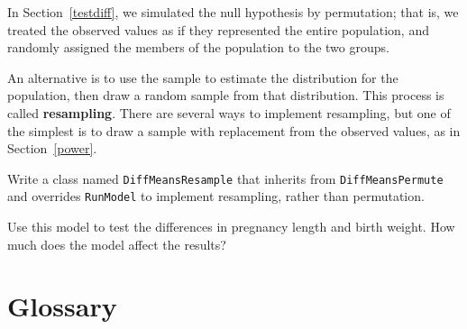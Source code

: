 \begin{exercise}

In Section~\ref{testdiff}, we simulated the null hypothesis by
permutation; that is, we treated the observed values as if they
represented the entire population, and randomly assigned the
members of the population to the two groups.

An alternative is to use the sample to estimate the distribution for
the population, then draw a random sample from that distribution.
This process is called {\bf resampling}.  There are several ways to
implement resampling, but one of the simplest is to draw a sample
with replacement from the observed values, as in Section~\ref{power}.

Write a class named {\tt DiffMeansResample} that inherits from
{\tt DiffMeansPermute} and overrides {\tt RunModel} to implement
resampling, rather than permutation.

Use this model to test the differences in pregnancy length and
birth weight.  How much does the model affect the results?

\end{exercise}


\section{Glossary}

